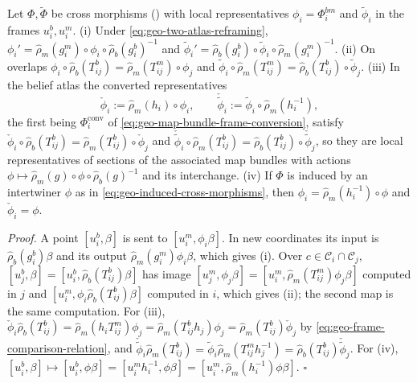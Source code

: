 Let \(\Phi,\widetilde\Phi\) be cross morphisms () with local
representatives \(\phi_i=\Phi_i^{bm}\) and \(\widetilde\phi_i\) in the frames \(u_i^b,u_i^m\). (i) Under
\eqref{eq:geo-two-atlas-reframing},
\(\phi_i'=\widehat\rho_m(g_i^m)\circ\phi_i\circ\widehat\rho_b(g_i^b)^{-1}\) and
\(\widetilde\phi_i'=\widehat\rho_b(g_i^b)\circ\widetilde\phi_i\circ\widehat\rho_m(g_i^m)^{-1}\).
(ii) On overlaps
\(\phi_i\circ\widehat\rho_b(T_{ij}^b)=\widehat\rho_m(T_{ij}^m)\circ\phi_j\) and
\(\widetilde\phi_i\circ\widehat\rho_m(T_{ij}^m)=\widehat\rho_b(T_{ij}^b)\circ\widetilde\phi_j\).
(iii) In the belief atlas the converted representatives
\begin{equation}
\check\phi_i:=\widehat\rho_m(h_i)\circ\phi_i,
\qquad
\check{\widetilde\phi}_i:=\widetilde\phi_i\circ\widehat\rho_m(h_i^{-1}),
\label{eq:geo-two-atlas-map-conversion}
\end{equation}
the first being \(\Phi_i^{\mathrm{conv}}\) of \eqref{eq:geo-map-bundle-frame-conversion}, satisfy
\(\check\phi_i\circ\widehat\rho_b(T_{ij}^b)=\widehat\rho_m(T_{ij}^b)\circ\check\phi_j\) and
\(\check{\widetilde\phi}_i\circ\widehat\rho_m(T_{ij}^b)=\widehat\rho_b(T_{ij}^b)\circ
\check{\widetilde\phi}_j\), so they are local representatives of sections of the associated map
bundles with actions \(\phi\mapsto\widehat\rho_m(g)\circ\phi\circ\widehat\rho_b(g)^{-1}\) and its
interchange. (iv) If \(\Phi\) is induced by an intertwiner \(\phi\) as in
\eqref{eq:geo-induced-cross-morphisms}, then \(\phi_i=\widehat\rho_m(h_i^{-1})\circ\phi\) and
\(\check\phi_i=\phi\). 

\noindent\emph{Proof.}
A point \([u_i^b,\beta]\) is sent to \([u_i^m,\phi_i\beta]\). In new coordinates its input is
\(\widehat\rho_b(g_i^b)\beta\) and its output \(\widehat\rho_m(g_i^m)\phi_i\beta\), which gives (i).
Over \(c\in\mathcal C_i\cap\mathcal C_j\), \([u_j^b,\beta]=[u_i^b,\widehat\rho_b(T_{ij}^b)\beta]\) has
image \([u_j^m,\phi_j\beta]=[u_i^m,\widehat\rho_m(T_{ij}^m)\phi_j\beta]\) computed in \(j\) and
\([u_i^m,\phi_i\widehat\rho_b(T_{ij}^b)\beta]\) computed in \(i\), which gives (ii); the second map
is the same computation. For (iii),
\(\check\phi_i\widehat\rho_b(T_{ij}^b)=\widehat\rho_m(h_iT_{ij}^m)\phi_j
=\widehat\rho_m(T_{ij}^bh_j)\phi_j=\widehat\rho_m(T_{ij}^b)\check\phi_j\) by
\eqref{eq:geo-frame-comparison-relation}, and
\(\check{\widetilde\phi}_i\widehat\rho_m(T_{ij}^b)=\widetilde\phi_i\widehat\rho_m(T_{ij}^mh_j^{-1})
=\widehat\rho_b(T_{ij}^b)\check{\widetilde\phi}_j\). For (iv),
\([u_i^b,\beta]\mapsto[u_i^b,\phi\beta]=[u_i^mh_i^{-1},\phi\beta]=[u_i^m,\widehat\rho_m(h_i^{-1})\phi\beta]\).
\hfill$\square$

